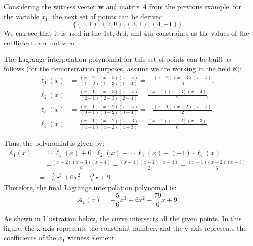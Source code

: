 \documentclass[../lecture-notes.tex]{subfiles}
\begin{document}
\begin{example}
    Considering the witness vector $\mathbf{w}$ and matrix $A$ from the previous example, for the variable
    $x_1$, the next set of points can be derived:
    \begin{equation*}
        \{(1,1), (2,0), (3,1), (4,-1)\}
    \end{equation*}
    We can see that it is used in the 1st, 3rd, and 4th constraints as the values of the coefficients
    are not zero.
    
    The Lagrange interpolation polynomial for this set of points can be built as follows (for the demonstration purposes, assume we are working in the field $\mathbb{R}$):
    \begin{align*}
        \ell_1(x) &= \frac{(x - 2)(x - 3)(x - 4)}{(1 - 2)(1 - 3)(1 - 4)} = -\frac{(x - 2)(x - 3)(x - 4)}{6}, \\
        \ell_2(x) &= \frac{(x - 1)(x - 3)(x - 4)}{(2 - 1)(2 - 3)(2 - 4)} = \frac{(x - 1)(x - 3)(x - 4)}{2}, \\
        \ell_3(x) &= \frac{(x - 1)(x - 2)(x - 4)}{(3 - 1)(3 - 2)(3 - 4)} = -\frac{(x - 1)(x - 2)(x - 4)}{2}, \\
        \ell_4(x) &= \frac{(x - 1)(x - 2)(x - 3)}{(4 - 1)(4 - 2)(4 - 3)} = \frac{(x - 1)(x - 2)(x - 3)}{6}.
    \end{align*}

    Thus, the polynomial is given by:
    \begin{align*}
        A_1(x) &= 1 \cdot \ell_1(x) + 0 \cdot \ell_2(x) + 1 \cdot \ell_3(x) + (-1) \cdot \ell_4(x) \\
        &= -\frac{(x - 2)(x - 3)(x - 4)}{6} - \frac{(x - 1)(x - 2)(x - 4)}{2} - \frac{(x - 1)(x - 2)(x - 3)}{6} \\
        &= -\frac{5}{6}x^3 + 6x^2 - \frac{79}{6}x + 9
    \end{align*}
    Therefore, the final Lagrange interpolation polynomial is:
    \begin{equation*}
        A_1(x) = -\frac{5}{6}x^3 + 6x^2 - \frac{79}{6}x + 9
    \end{equation*}

    As shown in Illustration below, the curve intersects all the given points.
    In this figure, the x-axis represents the constraint number, and the y-axis represents the 
    coefficients of the $x_1$ witness element.


\end{example}
\end{document}
